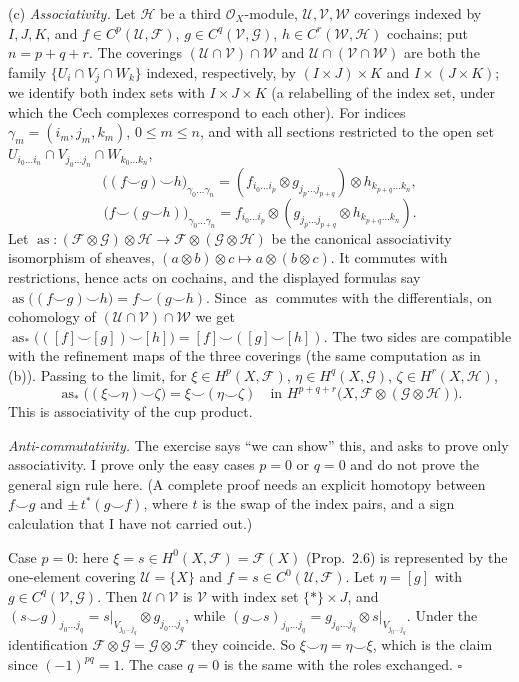 \documentclass[11pt]{article}
\begin{document}
(c) \emph{Associativity.} Let $\mathcal H$ be a third $\mathcal O_X$-module, $\mathcal U,\mathcal V,\mathcal W$ coverings indexed by $I,J,K$, and $f\in C^p(\mathcal U,\mathcal F)$, $g\in C^q(\mathcal V,\mathcal G)$, $h\in C^r(\mathcal W,\mathcal H)$ cochains; put $n=p+q+r$. The coverings $(\mathcal U\cap\mathcal V)\cap\mathcal W$ and $\mathcal U\cap(\mathcal V\cap\mathcal W)$ are both the family $\{U_i\cap V_j\cap W_k\}$ indexed, respectively, by $(I\times J)\times K$ and $I\times(J\times K)$; we identify both index sets with $I\times J\times K$ (a relabelling of the index set, under which the Cech complexes correspond to each other). For indices $\gamma_m=(i_m,j_m,k_m)$, $0\le m\le n$, and with all sections restricted to the open set $U_{i_0\dots i_n}\cap V_{j_0\dots j_n}\cap W_{k_0\dots k_n}$,
\[ \bigl((f\smile g)\smile h\bigr)_{\gamma_0\dots\gamma_n}=(f_{i_0\dots i_p}\otimes g_{j_p\dots j_{p+q}})\otimes h_{k_{p+q}\dots k_n}, \]
\[ \bigl(f\smile(g\smile h)\bigr)_{\gamma_0\dots\gamma_n}=f_{i_0\dots i_p}\otimes(g_{j_p\dots j_{p+q}}\otimes h_{k_{p+q}\dots k_n}). \]
Let $\operatorname{as}:(\mathcal F\otimes\mathcal G)\otimes\mathcal H\to\mathcal F\otimes(\mathcal G\otimes\mathcal H)$ be the canonical associativity isomorphism of sheaves, $(a\otimes b)\otimes c\mapsto a\otimes(b\otimes c)$. It commutes with restrictions, hence acts on cochains, and the displayed formulas say $\operatorname{as}\bigl((f\smile g)\smile h\bigr)=f\smile(g\smile h)$. Since $\operatorname{as}$ commutes with the differentials, on cohomology of $(\mathcal U\cap\mathcal V)\cap\mathcal W$ we get $\operatorname{as}_*\bigl(([f]\smile[g])\smile[h]\bigr)=[f]\smile([g]\smile[h])$. The two sides are compatible with the refinement maps of the three coverings (the same computation as in (b)). Passing to the limit, for $\xi\in H^p(X,\mathcal F)$, $\eta\in H^q(X,\mathcal G)$, $\zeta\in H^r(X,\mathcal H)$,
\[ \operatorname{as}_*\bigl((\xi\smile\eta)\smile\zeta\bigr)=\xi\smile(\eta\smile\zeta)\quad\text{in }H^{p+q+r}\bigl(X,\mathcal F\otimes(\mathcal G\otimes\mathcal H)\bigr). \]
This is associativity of the cup product.

\emph{Anti-commutativity.} The exercise says ``we can show'' this, and asks to prove only associativity. I prove only the easy cases $p=0$ or $q=0$ and do not prove the general sign rule here. (A complete proof needs an explicit homotopy between $f\smile g$ and $\pm\,t^*(g\smile f)$, where $t$ is the swap of the index pairs, and a sign calculation that I have not carried out.)

Case $p=0$: here $\xi=s\in H^0(X,\mathcal F)=\mathcal F(X)$ (Prop.~2.6) is represented by the one-element covering $\mathcal U=\{X\}$ and $f=s\in C^0(\mathcal U,\mathcal F)$. Let $\eta=[g]$ with $g\in C^q(\mathcal V,\mathcal G)$. Then $\mathcal U\cap\mathcal V$ is $\mathcal V$ with index set $\{*\}\times J$, and $(s\smile g)_{j_0\dots j_q}=s|_{V_{j_0\dots j_q}}\otimes g_{j_0\dots j_q}$, while $(g\smile s)_{j_0\dots j_q}=g_{j_0\dots j_q}\otimes s|_{V_{j_0\dots j_q}}$. Under the identification $\mathcal F\otimes\mathcal G=\mathcal G\otimes\mathcal F$ they coincide. So $\xi\smile\eta=\eta\smile\xi$, which is the claim since $(-1)^{pq}=1$. The case $q=0$ is the same with the roles exchanged. \hfill$\square$
\end{document}
